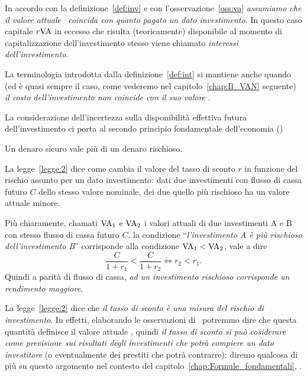\begin{defn}\label{def:int}
  In accordo con la definizione~\ref{def:inv} e con l'osservazione~\ref{oss:va} \emph{assumiamo che il valore attuale \VA\ coincida
    con quanto pagato un dato investimento}. In questo caso capitale $r\mathrm{VA}$ in eccesso che risulta (teoricamente) disponibile al momento
  di capitalizzazione dell'investimento stesso viene chiamato \emph{interessi dell'investimento}.
\end{defn}

La terminologia introdotta dalla definizione~\ref{def:int} si mantiene anche quando (ed è quasi sempre il caso, come vederemo nel
capitolo~\ref{chap:Il_VAN} seguente) \emph{il costo dell'investimento non coincide con il suo valore \VA }.

La considerazione dell'incertezza sulla disponibilità effettiva futura dell'investimento ci porta al secondo principio fondamentale
dell'economia (\cite[§2.1.3 p. 14]{brealey_et_al1999})

\begin{legge}\label{legge:2}
  Un denaro sicuro vale più di un denaro rischioso.  
\end{legge}
La legge~\ref{legge:2} dice come cambia il valore del tasso di sconto $r$ in funzione del rischio assunto per un dato investimento:
dati due investimenti con flusso di cassa futuro $C$ dello stesso valore nominale, dei due quello più rischioso ha un valore attuale minore.
\begin{oss}
  Più chiaramente, chamati $\mathrm{VA}_1$ e $\mathrm{VA}_2$ i valori attuali di due investimenti A e B con stesso flusso di cassa futuro $C$,
  la condizione ``\emph{l'investimento A è più rischioso dell'investimento B}'' corrisponde alla condizione $\mathrm{VA}_1< \mathrm{VA}_2$,
  vale a dire
  \[
    \frac{C}{1+r_1} < \frac{C}{1+r_2} \iff r_2 < r_1.
  \]
  Quindi a parità di flusso di cassa, \emph{ad un investimento rischioso corrisponde un rendimento maggiore}.
\end{oss}

\begin{oss}
  La legge~\ref{legge:2} dice che \emph{il tasso di sconto è una misura del rischio di investimento}. In effetti, elaborando le osservazioni
  di~\cite[§7, p. 158]{Levi1957} potremmo dire che questa quantità definisce il valore attuale \VA, quindi \emph{il tasso di sconto si può
    cosiderare come previsione sui risultati degli investimenti che potrà compiere un dato investitore} (o eventualmente dei prestiti
  che potrà contrarre): diremo qualcosa di più su questo argomento nel contesto del capitolo~\ref{chap:Formule_fondamentali}, .
\end{oss}

